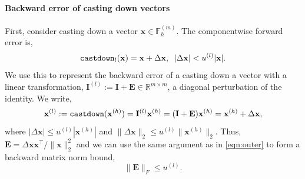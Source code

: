 \documentclass[review,onefignum,onetabnum]{siamart190516}
\newcommand{\R}{\mathbb{R}}
\newcommand{\F}{\mathbb{F}}
\newcommand{\dd}{\delta}
\newcommand{\bb}[1]{\mathbf{#1}}
\begin{document}
\paragraph{Backward error of casting down vectors} First, consider 
casting down a vector  $\bb{x}\in\F_h^{(m)}$.
The componentwise forward error is, \[\text{\tt castdown}_{l}(\bb{x}) = \bb{x} + \Delta {\bb{x}},\;\; |\Delta\bb{x}| < u^{(l)}|\bb{x}|.\]
We use this to represent the backward error of a casting down a vector with a linear transformation, $\bb{I}^{(l)}:=\bb{I} +\bb{E}\in\R^{m\times m}$, a diagonal perturbation of the identity.
We write,
\begin{equation}
\bb{x}^{(l)} := \text{\tt castdown}(\bb{x}^{(h)}) = \bb{I}^{(l)}\bb{x}^{(h)} = (\bb{I}+\bb{E})\bb{x}^{(h)} = \bb{x}^{(h)}+\Delta \bb{x},
\end{equation}
where $|\Delta \bb{x}| \leq u^{(l)} |\bb{x}^{(h)}|$ and  $\|\Delta \bb{x}\|_2 \leq u^{(l)} \|\bb{x}^{(h)}\|_2$.
Thus, $\bb{E} = \Delta \bb{x x}^{\top}/\|\bb{x}\|_2^2$ and we can use the same argument as in \cref{eqn:outer} to form a backward matrix norm bound, 
\begin{equation}
\|\bb{E}\|_F\leq u^{(l)}. \label{eqn:castdown}
\end{equation}
\end{document}

